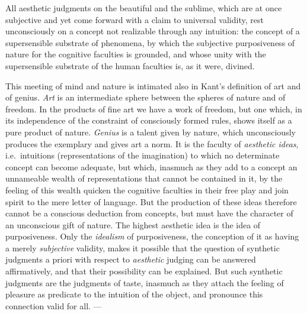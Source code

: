 All aesthetic judgments on the beautiful and the sublime, which are at
once subjective and yet come forward with a claim to universal
validity, rest unconsciously on a concept not realizable through any
intuition: the concept of a supersensible substrate of phenomena, by
which the subjective purposiveness of nature for the cognitive
faculties is grounded, and whose unity with the supersensible substrate
of the human faculties is, as it were, divined.

This meeting of mind and nature is intimated also in Kant's definition
of art and of genius. \emph{Art} is an intermediate sphere between the
spheres of nature and of freedom. In the products of fine art we have a
work of freedom, but one which, in its independence of the
constraint of consciously formed rules, shows itself as a pure product
of nature. \emph{Genius} is a talent given by nature, which
unconsciously produces the exemplary and gives art a norm. It is the
faculty of \emph{aesthetic ideas}, i.e.\ intuitions (representations of
the imagination) to which no determinate concept can become adequate,
but which, inasmuch as they add to a concept an unnameable wealth of
representations that cannot be contained in it, by the feeling of this
wealth quicken the cognitive faculties in their free play and join
spirit to the mere letter of language. But the production of these
ideas therefore cannot be a conscious deduction from concepts, but must
have the character of an unconscious gift of nature. The highest
aesthetic idea is the idea of purposiveness. Only the \emph{idealism}
of purposiveness, the conception of it as having a merely
\emph{subjective} validity, makes it possible that the question of
synthetic judgments a priori with respect to \emph{aesthetic} judging
can be answered affirmatively, and that their possibility can be
explained. But such synthetic judgments are the judgments of taste,
inasmuch as they attach the feeling of pleasure as predicate to the
intuition of the object, and pronounce this connection valid for all.
---

